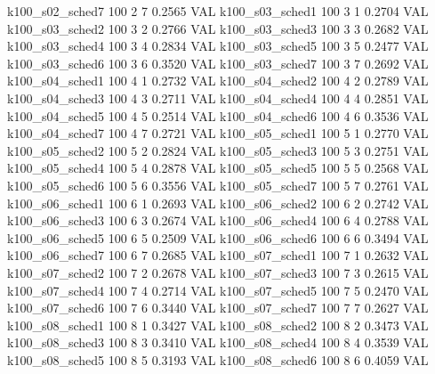   k100_s02_sched7                  100    2   7    0.2565  VAL
  k100_s03_sched1                  100    3   1    0.2704  VAL
  k100_s03_sched2                  100    3   2    0.2766  VAL
  k100_s03_sched3                  100    3   3    0.2682  VAL
  k100_s03_sched4                  100    3   4    0.2834  VAL
  k100_s03_sched5                  100    3   5    0.2477  VAL
  k100_s03_sched6                  100    3   6    0.3520  VAL
  k100_s03_sched7                  100    3   7    0.2692  VAL
  k100_s04_sched1                  100    4   1    0.2732  VAL
  k100_s04_sched2                  100    4   2    0.2789  VAL
  k100_s04_sched3                  100    4   3    0.2711  VAL
  k100_s04_sched4                  100    4   4    0.2851  VAL
  k100_s04_sched5                  100    4   5    0.2514  VAL
  k100_s04_sched6                  100    4   6    0.3536  VAL
  k100_s04_sched7                  100    4   7    0.2721  VAL
  k100_s05_sched1                  100    5   1    0.2770  VAL
  k100_s05_sched2                  100    5   2    0.2824  VAL
  k100_s05_sched3                  100    5   3    0.2751  VAL
  k100_s05_sched4                  100    5   4    0.2878  VAL
  k100_s05_sched5                  100    5   5    0.2568  VAL
  k100_s05_sched6                  100    5   6    0.3556  VAL
  k100_s05_sched7                  100    5   7    0.2761  VAL
  k100_s06_sched1                  100    6   1    0.2693  VAL
  k100_s06_sched2                  100    6   2    0.2742  VAL
  k100_s06_sched3                  100    6   3    0.2674  VAL
  k100_s06_sched4                  100    6   4    0.2788  VAL
  k100_s06_sched5                  100    6   5    0.2509  VAL
  k100_s06_sched6                  100    6   6    0.3494  VAL
  k100_s06_sched7                  100    6   7    0.2685  VAL
  k100_s07_sched1                  100    7   1    0.2632  VAL
  k100_s07_sched2                  100    7   2    0.2678  VAL
  k100_s07_sched3                  100    7   3    0.2615  VAL
  k100_s07_sched4                  100    7   4    0.2714  VAL
  k100_s07_sched5                  100    7   5    0.2470  VAL
  k100_s07_sched6                  100    7   6    0.3440  VAL
  k100_s07_sched7                  100    7   7    0.2627  VAL
  k100_s08_sched1                  100    8   1    0.3427  VAL
  k100_s08_sched2                  100    8   2    0.3473  VAL
  k100_s08_sched3                  100    8   3    0.3410  VAL
  k100_s08_sched4                  100    8   4    0.3539  VAL
  k100_s08_sched5                  100    8   5    0.3193  VAL
  k100_s08_sched6                  100    8   6    0.4059  VAL
